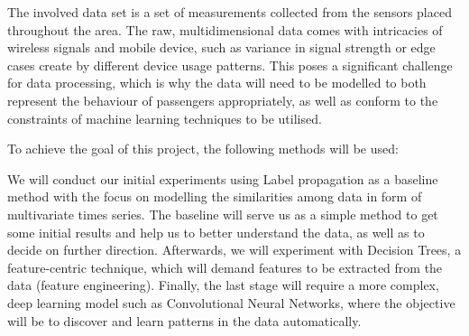 \par
The involved data set is a set of measurements collected from the sensors placed throughout the area. The raw, multidimensional data comes with intricacies of wireless signals and mobile device, such as variance in signal strength or edge cases create by different device usage patterns. This poses a significant challenge for data processing, which is why the data will need to be modelled to both represent the behaviour of passengers appropriately, as well as conform to the constraints of machine learning techniques to be utilised. \newline

\par
To achieve the goal of this project, the following methods will be used:

We will conduct our initial experiments using Label propagation as a baseline method with the focus on modelling the similarities among data in form of multivariate times series. The baseline will serve us as a simple method to get some initial results and help us to better understand the data, as well as to decide on further direction.
Afterwards, we will experiment with Decision Trees, a feature-centric technique, which will demand features to be extracted from the data (feature engineering).
Finally, the last stage will require a more complex, deep learning model such as Convolutional Neural Networks, where the objective will be to discover and learn patterns in the data automatically.